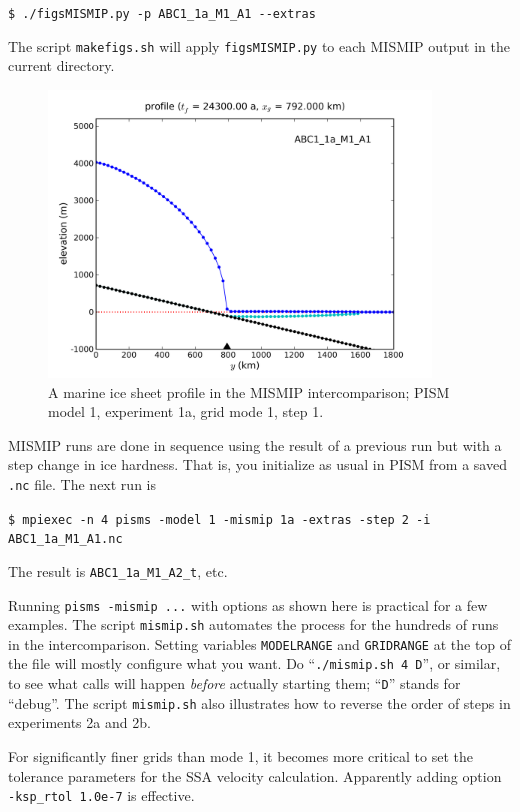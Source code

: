 \documentclass[11pt,final]{amsart}
\begin{document}
\verb|$ ./figsMISMIP.py -p ABC1_1a_M1_A1 --extras|

\noindent The script \verb|makefigs.sh| will apply \verb|figsMISMIP.py| to each MISMIP output in the current directory.

\begin{figure}[ht]
\includegraphics[width=4.0in,keepaspectratio=true]{figs/profile_EBU1_1a_M1_A1}
\caption{A marine ice sheet profile in the MISMIP intercomparison; PISM model 1, experiment 1a, grid mode 1, step 1.}
\label{fig:MISMIPmodel1exper1aM1A1}
\end{figure}

MISMIP runs are done in sequence using the result of a previous run but with a step change in ice hardness.  That is, you initialize as usual in PISM from a saved \verb|.nc| file.  The next run is

\verb|$ mpiexec -n 4 pisms -model 1 -mismip 1a -extras -step 2 -i ABC1_1a_M1_A1.nc|

\noindent The result is \verb|ABC1_1a_M1_A2_t|, etc.

Running \verb|pisms -mismip ...| with options as shown here is practical for a few examples.  The script \verb|mismip.sh| automates the process for the hundreds of runs in the intercomparison.  Setting variables \verb|MODELRANGE| and \verb|GRIDRANGE| at the top of the file will mostly configure what you want.  Do ``\verb|./mismip.sh 4 D|'', or similar, to see what calls will happen \emph{before} actually starting them; ``\verb|D|'' stands for ``debug''.  The script \verb|mismip.sh| also illustrates how to reverse the order of steps in experiments 2a and 2b.

For significantly finer grids than mode 1, it becomes more critical to set the tolerance parameters for the SSA velocity calculation.  Apparently adding option \verb|-ksp_rtol 1.0e-7| is effective.
\end{document}
